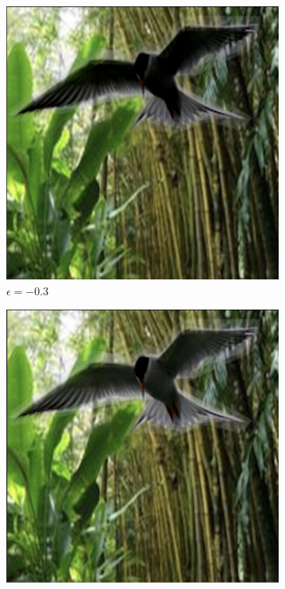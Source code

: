 \begin{figure}[!b]
\centering
\begin{subfigure}[b]{0.136\textwidth}
  \includegraphics[width=0.99\linewidth]{plotsAistats/bird_light_03_dark.png}
  \caption{$\epsilon = -0.3$}
  \label{fig:dark_03}
\end{subfigure}
\begin{subfigure}[b]{0.136\textwidth}
  \includegraphics[width=0.99\linewidth]{plotsAistats/bird_light_02_dark.png}

\end{subfigure}
\end{figure}
